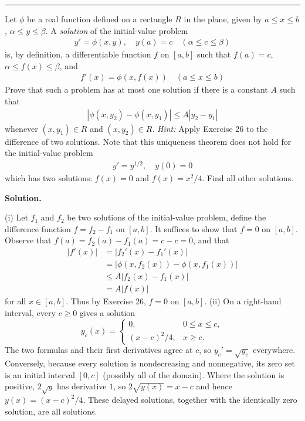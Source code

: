 \documentclass[12pt]{article}
\theoremstyle{definition}
\begin{document}
\bigskip\noindent\hrule\bigskip

Let $\phi$ be a real function defined on a rectangle $R$ in the plane, given by $a\le x\le b$, $\alpha\le y\le \beta$. A \textit{solution} of the initial-value problem
\begin{align*}
y'=\phi(x,y),\quad y(a)=c\quad(\alpha\le c\le\beta)
\end{align*}
is, by definition, a differentiable function $f$ on $[a,b]$ such that $f(a)=c$, $\alpha\le f(x)\le\beta$, and
\begin{align*}
f'(x)=\phi(x,f(x))\quad(a\le x\le b)
\end{align*}
Prove that such a problem has at most one solution if there is a constant $A$ such that
\begin{align*}
\left\vert\phi(x,y_2)-\phi(x,y_1)\right\vert\le A\left\vert y_2-y_1\right\vert
\end{align*}
whenever $(x,y_1)\in R$ and $(x,y_2)\in R$.
\textit{Hint:} Apply Exercise 26 to the difference of two solutions. Note that this uniqueness theorem does not hold for the initial-value problem
\begin{align*}
y'=y^{1/2},\quad y(0)=0
\end{align*}
which has two solutions: $f(x)=0$ and $f(x)=x^2/4$. Find all other solutions.

\smallskip
\noindent\textbf{Solution.}\quad

(i) Let $f_1$ and $f_2$ be two solutions of the initial-value problem, define the difference function $f=f_2-f_1$ on $[a,b]$. It suffices to show that $f=0$ on $[a,b]$. Observe that $f(a)=f_2(a)-f_1(a)=c-c=0$, and that
\begin{align*}
\left\vert f'(x)\right\vert
&=\left\vert f_2'(x)-f_1'(x)\right\vert \\
&=\left\vert \phi(x,f_2(x))-\phi(x,f_1(x))\right\vert \\
&\le A\left\vert f_2(x)-f_1(x)\right\vert \\
&=A\left\vert f(x)\right\vert
\end{align*}
for all $x\in[a,b]$. Thus by Exercise 26, $f=0$ on $[a,b]$.
(ii) On a right-hand interval, every $c\ge0$ gives a solution
\[
 y_c(x)=\begin{cases}0,&0\le x\le c,\\(x-c)^2/4,&x\ge c.\end{cases}
\]
The two formulas and their first derivatives agree at $c$, so $y_c'=\sqrt{y_c}$ everywhere.  Conversely, because every solution is nondecreasing and nonnegative, its zero set is an initial interval $[0,c]$ (possibly all of the domain).  Where the solution is positive, $2\sqrt y$ has derivative $1$, so $2\sqrt{y(x)}=x-c$ and hence $y(x)=(x-c)^2/4$.  These delayed solutions, together with the identically zero solution, are all solutions.
\end{document}
